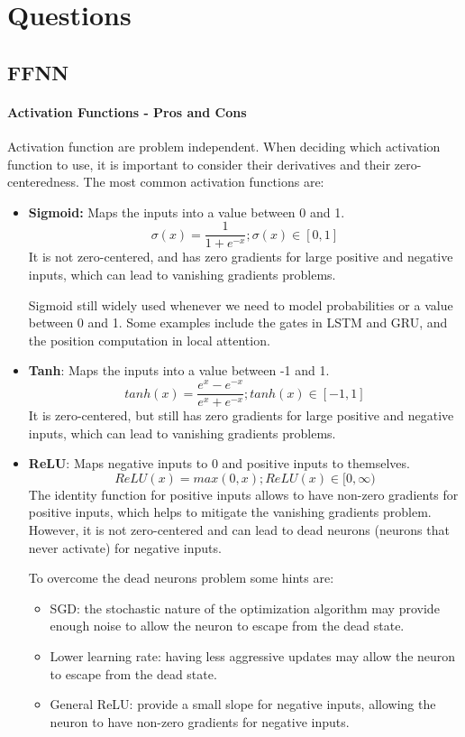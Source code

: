 \section{Questions}

\subsection{FFNN}
\paragraph{Activation Functions - Pros and Cons}
Activation function are problem independent. When deciding which activation function to use, it is important to consider their derivatives and their zero-centeredness. 
The most common activation functions are:
\begin{itemize}
    \item \textbf{Sigmoid:} Maps the inputs into a value between 0 and 1.
    \[ \sigma(x) = \frac{1}{1 + e^{-x}} ; \sigma(x) \in [0, 1] \]
    It is not zero-centered, and has zero gradients for large positive and negative inputs, which can lead to vanishing gradients problems.

    Sigmoid still widely used whenever we need to model probabilities or a value between 0 and 1. 
    Some examples include the gates in LSTM and GRU, and the position computation in local attention.

    \item \textbf{Tanh}: Maps the inputs into a value between -1 and 1.
    \[ tanh(x) = \frac{e^x - e^{-x}}{e^x + e^{-x}} ; tanh(x) \in [-1, 1] \]
    It is zero-centered, but still has zero gradients for large positive and negative inputs, which can lead to vanishing gradients problems.

    \item \textbf{ReLU}: Maps negative inputs to 0 and positive inputs to themselves.
    \[ ReLU(x) = max(0, x) ; ReLU(x) \in [0, \infty) \]
    The identity function for positive inputs allows to have non-zero gradients for positive inputs, which helps to mitigate the vanishing gradients problem.
    However, it is not zero-centered and can lead to dead neurons (neurons that never activate) for negative inputs.

    To overcome the dead neurons problem some hints are:
    \begin{itemize}
        \item SGD: the stochastic nature of the optimization algorithm may provide enough noise to allow the neuron to escape from the dead state.
        \item Lower learning rate: having less aggressive updates may allow the neuron to escape from the dead state.
        \item General ReLU: provide a small slope for negative inputs, allowing the neuron to have non-zero gradients for negative inputs.
    \end{itemize}


\end{itemize}
